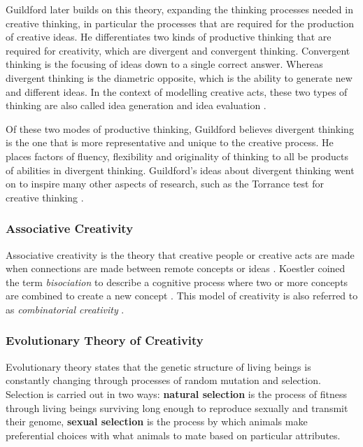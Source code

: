 Guildford later builds on this theory, expanding the thinking processes needed in creative thinking, in particular the processes that are required for the production of creative ideas.
He differentiates two kinds of productive thinking that are required for creativity, which are divergent and convergent thinking. 
Convergent thinking is the focusing of ideas down to a single correct answer. Whereas divergent thinking is the diametric opposite, which is the ability to generate new and different ideas. 
In the context of modelling creative acts, these two types of thinking are also called idea generation and idea evaluation \citep{guilford1957creative}.

Of these two modes of productive thinking, Guildford believes divergent thinking is the one that is more representative and unique to the creative process. He places factors of fluency, flexibility and originality of thinking to all be products of abilities in divergent thinking. 
Guildford's ideas about divergent thinking went on to inspire many other aspects of research, such as the Torrance test for creative thinking \citep{torrance1966torrance}.

\subsubsection{Associative Creativity}

Associative creativity is the theory that creative people or creative acts are made when connections are made between remote concepts or ideas \citep{mednick1962associative}. 
Koestler coined the term \textit{bisociation} to describe a cognitive process where two or more concepts are combined to create a new concept \citep{koestler1964act}.
This model of creativity is also referred to as \textit{combinatorial creativity} \citep{boden2004creative}.

\subsubsection{Evolutionary Theory of Creativity}

Evolutionary theory states that the genetic structure of living beings is constantly changing through processes of random mutation and selection. Selection is carried out in two ways: \textbf{natural selection} is the process of fitness through living beings surviving long enough to reproduce sexually and transmit their genome, \textbf{sexual selection} is the process by which animals make preferential choices with what animals to mate based on particular attributes.

